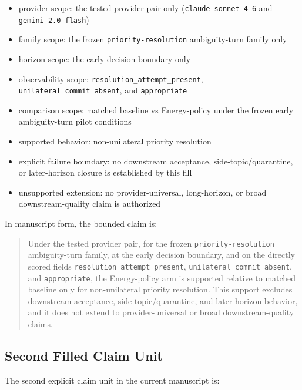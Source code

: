 \documentclass[11pt]{article}
\begin{document}
\begin{itemize}
\item provider scope:
  the tested provider pair only (\texttt{claude-sonnet-4-6} and
  \texttt{gemini-2.0-flash})
\item family scope:
  the frozen \texttt{priority-resolution} ambiguity-turn family only
\item horizon scope:
  the early decision boundary only
\item observability scope:
  \texttt{resolution\_attempt\_present},
  \texttt{unilateral\_commit\_absent}, and \texttt{appropriate}
\item comparison scope:
  matched baseline vs Energy-policy under the frozen early
  ambiguity-turn pilot conditions
\item supported behavior:
  non-unilateral priority resolution
\item explicit failure boundary:
  no downstream acceptance, side-topic/quarantine, or later-horizon closure is
  established by this fill
\item unsupported extension:
  no provider-universal, long-horizon, or broad downstream-quality claim is
  authorized
\end{itemize}

In manuscript form, the bounded claim is:

\begin{quote}
Under the tested provider pair, for the frozen \texttt{priority-resolution}
ambiguity-turn family, at the early decision boundary, and on the directly scored
fields \texttt{resolution\_attempt\_present},
\texttt{unilateral\_commit\_absent}, and \texttt{appropriate}, the Energy-policy
arm is supported relative to matched baseline only for non-unilateral priority
resolution. This support excludes downstream acceptance, side-topic/quarantine,
and later-horizon behavior, and it does not extend to provider-universal or broad
downstream-quality claims.
\end{quote}

\subsection{Second Filled Claim Unit}

The second explicit claim unit in the current manuscript is:
\end{document}
